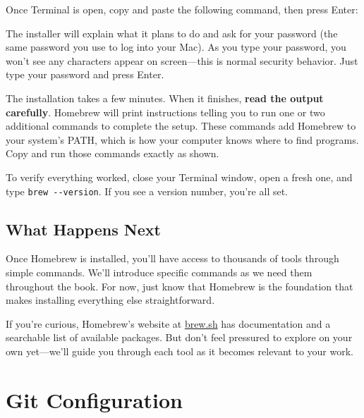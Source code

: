 \documentclass[
  letterpaper,
  DIV=11,
  numbers=noendperiod]{scrreprt}
\newenvironment{Shaded}{\begin{snugshade}}{\end{snugshade}}
\newcommand{\AttributeTok}[1]{\textcolor[rgb]{0.40,0.45,0.13}{#1}}
\newcommand{\ExtensionTok}[1]{\textcolor[rgb]{0.00,0.23,0.31}{#1}}
\newcommand{\NormalTok}[1]{\textcolor[rgb]{0.00,0.23,0.31}{#1}}
\newcommand{\StringTok}[1]{\textcolor[rgb]{0.13,0.47,0.30}{#1}}
\newcommand{\VariableTok}[1]{\textcolor[rgb]{0.07,0.07,0.07}{#1}}
\begin{document}
Once Terminal is open, copy and paste the following command, then press
Enter:

\begin{Shaded}
\end{Shaded}

The installer will explain what it plans to do and ask for your password
(the same password you use to log into your Mac). As you type your
password, you won't see any characters appear on screen---this is normal
security behavior. Just type your password and press Enter.

The installation takes a few minutes. When it finishes, \textbf{read the
output carefully}. Homebrew will print instructions telling you to run
one or two additional commands to complete the setup. These commands add
Homebrew to your system's PATH, which is how your computer knows where
to find programs. Copy and run those commands exactly as shown.

To verify everything worked, close your Terminal window, open a fresh
one, and type \texttt{brew\ -\/-version}. If you see a version number,
you're all set.

\section{What Happens Next}\label{what-happens-next}

Once Homebrew is installed, you'll have access to thousands of tools
through simple commands. We'll introduce specific commands as we need
them throughout the book. For now, just know that Homebrew is the
foundation that makes installing everything else straightforward.

If you're curious, Homebrew's website at \href{https://brew.sh}{brew.sh}
has documentation and a searchable list of available packages. But don't
feel pressured to explore on your own yet---we'll guide you through each
tool as it becomes relevant to your work.

\chapter{Git Configuration}\label{sec-git-config}
\end{document}

